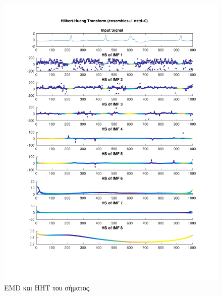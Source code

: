 \documentclass[11pt,a4paper]{article}
\begin{document}
\begin{figure}[H]
\begin{minipage}{0.48\textwidth}
	\includegraphics[width=\textwidth]{fig/221l1_hht.pdf}
\end{minipage}
\vfill
\caption{EMD και HHT του σήματος.}
\label{fig:221l1_hht}
\end{figure}
\end{document}
